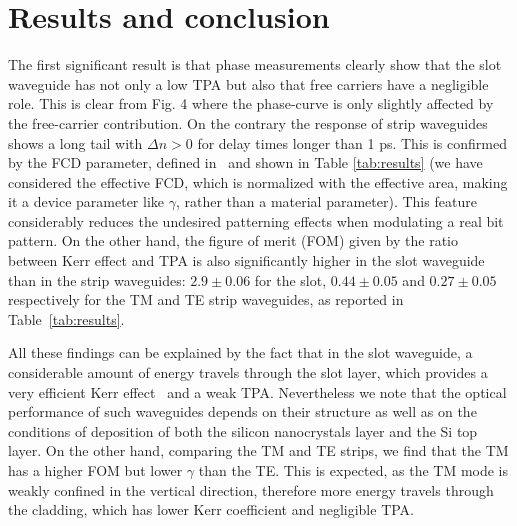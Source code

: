 \documentclass[10pt,letterpaper]{article}
\begin{document}
\section{Results and conclusion}
The first significant result is that phase measurements clearly show that the slot waveguide has not only a low TPA but also that free carriers have a negligible role. This is clear from Fig. 4 where the phase-curve is only slightly affected by the free-carrier contribution. On the contrary the response of strip waveguides shows a long tail with $\Delta n >0$ for delay times longer than 1 ps. This is confirmed by the FCD parameter, defined in~\cite{Lin2007} and shown in Table \ref{tab:results} (we have considered the effective FCD, which is normalized with the effective area, making it a device parameter like $\gamma$, rather than a material parameter). This feature considerably reduces the undesired patterning effects when modulating a real bit pattern. On the other hand, the figure of merit (FOM) given by the ratio between Kerr effect and TPA is also significantly higher in the slot waveguide than in the strip waveguides: $2.9\pm 0.06$ for the slot, $0.44 \pm 0.05$ and $0.27 \pm 0.05$ respectively for 
the TM and TE strip waveguides, as reported in Table~\ref{tab:results}. 

All these findings can be explained by the fact that in the slot waveguide, a considerable amount of energy travels through the slot layer, which provides a very efficient Kerr effect~\cite{Trita2011} and a weak TPA. Nevertheless we note that the optical performance of such waveguides depends on their structure as well as on the conditions of deposition of both the silicon nanocrystals layer and the Si top layer. On the other hand, comparing the TM and TE strips, we find that the TM has a higher FOM but lower $\gamma$ than the TE. This is expected, as the TM mode is weakly confined in the vertical direction, therefore more energy travels through the cladding, which has lower Kerr coefficient and negligible TPA.
\end{document}

